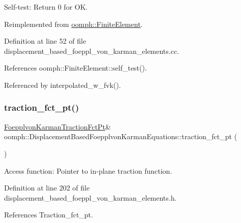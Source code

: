 Self-\/test\+: Return 0 for OK. 



Reimplemented from \hyperlink{classoomph_1_1FiniteElement_af94c5a5e22175d5420b33b3b79e46ed3}{oomph\+::\+Finite\+Element}.



Definition at line 52 of file displacement\+\_\+based\+\_\+foeppl\+\_\+von\+\_\+karman\+\_\+elements.\+cc.



References oomph\+::\+Finite\+Element\+::self\+\_\+test().



Referenced by interpolated\+\_\+w\+\_\+fvk().

\mbox{\label{classoomph_1_1DisplacementBasedFoepplvonKarmanEquations_adae0b6cc04c60bf4dcabdaea5edc3c54}} 
\subsubsection{\texorpdfstring{traction\+\_\+fct\+\_\+pt()}{traction\_fct\_pt()}\hspace{0.1cm}{\footnotesize\ttfamily [1/2]}}
{\footnotesize\ttfamily \hyperlink{classoomph_1_1DisplacementBasedFoepplvonKarmanEquations_ab2c41b3ecc15b89802657c068ee3e1cc}{Foepplvon\+Karman\+Traction\+Fct\+Pt}\& oomph\+::\+Displacement\+Based\+Foepplvon\+Karman\+Equations\+::traction\+\_\+fct\+\_\+pt (\begin{DoxyParamCaption}{ }\end{DoxyParamCaption})\hspace{0.3cm}{\ttfamily [inline]}}



Access function\+: Pointer to in-\/plane traction function. 



Definition at line 202 of file displacement\+\_\+based\+\_\+foeppl\+\_\+von\+\_\+karman\+\_\+elements.\+h.



References Traction\+\_\+fct\+\_\+pt.

